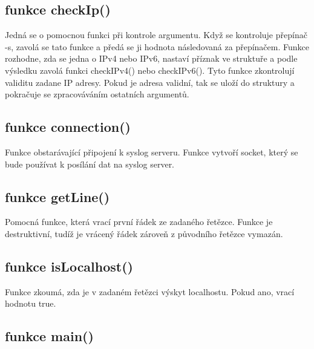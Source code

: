 \documentclass[a4paper]{article}
\begin{document}
	\subsection{funkce checkIp()}

	Jedná se o pomocnou funkci při kontrole argumentu. Když se kontroluje přepínač -s, zavolá se tato funkce a předá se ji hodnota následovaná za přepínačem. Funkce rozhodne, zda se jedna o IPv4 nebo IPv6, nastaví příznak ve struktuře a podle výsledku zavolá funkci checkIPv4() nebo checkIPv6(). Tyto funkce zkontrolují validitu zadane IP adresy. Pokud je adresa validní, tak se uloží do struktury a pokračuje se zpracováváním ostatních argumentů.

	\subsection{funkce connection()}

	Funkce obstarávající připojení k syslog serveru. Funkce vytvoří socket, který se bude používat k posílání dat na syslog server.

	\subsection{funkce getLine()}

	Pomocná funkce, která vrací první řádek ze zadaného řetězce. Funkce je destruktivní, tudíž je vrácený řádek zároveň z původního řetězce vymazán.

	\subsection{funkce isLocalhost()}

	Funkce zkoumá, zda je v zadaném řetězci výskyt localhostu. Pokud ano, vrací hodnotu true.

	\subsection{funkce main()}
\end{document}

